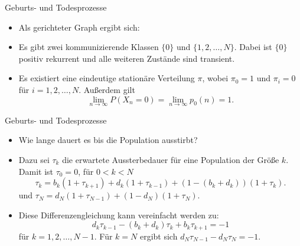 \documentclass{beamer}
\begin{document}
\begin{frame}{Geburts- und Todesprozesse}
  \begin{itemize}
  \item Als gerichteter Graph ergibt sich:
  \item Es gibt zwei kommunizierende Klassen $\{0\}$ und $\{1,2,\dots,N\}$. Dabei ist $\{0\}$ positiv rekurrent und alle weiteren Zustände sind transient.
  \item Es existiert eine
    eindeutige stationäre Verteilung $π$, wobei $π_0 = 1$ und $π_i = 0$
    für $i = 1,2,\dots,N$. Außerdem gilt
    \[
      \lim_{n→∞} P(X_n = 0) = \lim_{n→∞}p_0(n) = 1.
    \]
  \end{itemize}
\end{frame}
\begin{frame}{Geburts- und Todesprozesse}
  \begin{itemize}
  \item Wie lange dauert es bis die Population ausstirbt?
  \item Dazu sei $τ_k$ die erwartete Aussterbedauer für eine Population der Größe $k$. Damit ist $τ_0 = 0$, für $0 < k < N$
    \[
      τ_k = b_k(1+τ_{k+1}) + d_k(1 + τ_{k-1}) + (1-(b_k + d_k))(1+τ_k).
    \]
    und $τ_N = d_N(1+τ_{N-1}) + (1-d_N)(1+τ_N)$.
  \item Diese Differenzengleichung kann vereinfacht werden zu:
    \[
      d_kτ_{k-1} - (b_k+d_k)τ_k + b_kτ_{k+1} = -1
    \]
    für $k = 1,2,\dots,N-1$. Für $k = N$ ergibt sich $d_Nτ_{N-1} - d_Nτ_N = -1$.
  \end{itemize}
\end{frame}
\end{document}
